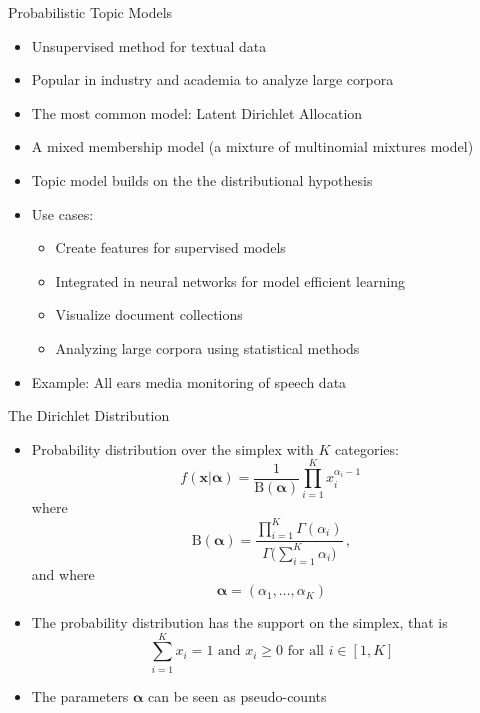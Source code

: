 \documentclass[10pt]{beamer}
\begin{document}
\begin{frame}{Probabilistic Topic Models}

\begin{itemize}
    \item Unsupervised method for {\color{uured} textual data}\pause
    \item Popular in industry and academia to {\color{uured} analyze large corpora}\pause
    \item The most common model: {\color{uured} Latent Dirichlet Allocation}
    \item A {\color{uured} mixed membership} model (a mixture of multinomial mixtures model)\pause
    \item Topic model builds on the the {\color{uured} distributional hypothesis}\pause
    \item Use cases:
    \begin{itemize}
        \item Create features for supervised models\pause
        \item Integrated in neural networks for model efficient learning\pause
        \item Visualize document collections\pause
        \item Analyzing large corpora using statistical methods\pause
    \end{itemize}
    \item Example: {\color{uured} All ears} media monitoring of speech data
\end{itemize}
\end{frame}



\begin{frame}{The Dirichlet Distribution}

\begin{itemize}
    \item Probability distribution over the simplex with $K$ categories:
\[
f({\boldsymbol {x} }| {\boldsymbol {\alpha }}) = {\frac {1}{\mathrm {B} ({\boldsymbol {\alpha }})}} \prod _{i=1}^{K}x_{i}^{\alpha _{i}-1}\,
\]
where
\[
{\displaystyle \mathrm {B} ({\boldsymbol {\alpha }})={\frac {\prod _{i=1}^{K}\Gamma (\alpha _{i})}{\Gamma {\bigl (}\sum _{i=1}^{K}\alpha _{i}{\bigr )}}}}\,,
\]
and where
\[
{\displaystyle {\boldsymbol {\alpha }}=(\alpha _{1},\ldots ,\alpha _{K})}
\]\pause
\item The probability distribution has the support on the simplex, that is
\[
    \sum_{i=1}^{K}x_{i}=1{\text{ and }}x_{i}\geq 0{\text{ for all }} i\in [1,K]
\]
\pause
\item The parameters ${\boldsymbol {\alpha }}$ can be seen as {\color{uured} pseudo-counts}
\end{itemize}
\end{frame}
\end{document}
